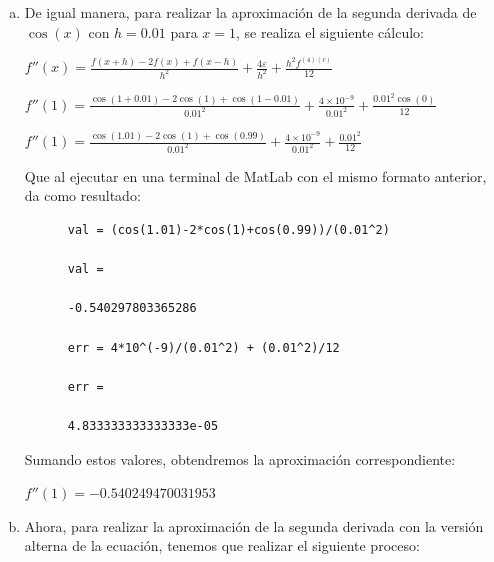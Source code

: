 \documentclass[english,notitlepage,letterpaper, 10pt]{article} %
\begin{document}
\begin{enumerate}
\begin{enumerate}[a)]
    
    \item De igual manera, para realizar la aproximación de la segunda derivada de $\cos(x)$ con $h=0.01$ para $x=1$, se realiza el siguiente cálculo:  
    
    \begin{center}  
      \begin{math}  
        f''(x) = \displaystyle \frac{f(x+h)-2f(x)+f(x-h)}{h^2} + \frac{4\varepsilon}{h^2} + \frac{h^2 f^{(4)(c)}}{12}
      \end{math}  
      
      \begin{math}  
        f''(1) = \displaystyle \frac{\cos(1+0.01)-2\cos(1)+\cos(1-0.01)}{0.01^2} + \frac{4\times 10^{-9}}{0.01^2} + \frac{0.01^2 \cos(0)}{12}
      \end{math}  
      
      \begin{math}  
        f''(1) = \displaystyle \frac{\cos(1.01)-2\cos(1)+\cos(0.99)}{0.01^2} + \frac{4\times 10^{-9}}{0.01^2} + \frac{0.01^2}{12}
      \end{math}  
    \end{center}  
    
    Que al ejecutar en una terminal de MatLab con el mismo formato anterior, da como resultado: 
    
    \begin{lstlisting}  
      val = (cos(1.01)-2*cos(1)+cos(0.99))/(0.01^2)   
      
      val = 
      
      -0.540297803365286 

      err = 4*10^(-9)/(0.01^2) + (0.01^2)/12        

      err =

      4.833333333333333e-05
    \end{lstlisting}  

    Sumando estos valores, obtendremos la aproximación correspondiente:
    
    \begin{center}  
      \begin{math}  
        f''(1) =  -0.540249470031953  
      \end{math}  
    \end{center}  
    
    \item Ahora, para realizar la aproximación de la segunda derivada con la versión alterna de la ecuación, tenemos que realizar el siguiente proceso: 
    

\end{enumerate}
\end{enumerate}
\end{document}
